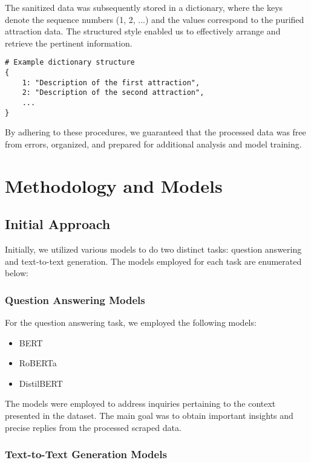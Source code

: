 \documentclass[conference]{IEEEtran}
\begin{document}
    The sanitized data was subsequently stored in a dictionary, where the keys denote the sequence numbers (1, 2, ...) and the values correspond to the purified attraction data. The structured style enabled us to effectively arrange and retrieve the pertinent information.

    \begin{verbatim}
# Example dictionary structure
{
    1: "Description of the first attraction",
    2: "Description of the second attraction",
    ...
}
    \end{verbatim}

    By adhering to these procedures, we guaranteed that the processed data was free from errors, organized, and prepared for additional analysis and model training.

\section{Methodology and Models}

    \subsection{Initial Approach}

        Initially, we utilized various models to do two distinct tasks: question answering and text-to-text generation. The models employed for each task are enumerated below:

        \subsubsection{Question Answering Models}

        For the question answering task, we employed the following models:
        \begin{itemize}
            \item BERT
            \item RoBERTa
            \item DistilBERT
        \end{itemize}

        The models were employed to address inquiries pertaining to the context presented in the dataset. The main goal was to obtain important insights and precise replies from the processed scraped data.

        \subsubsection{Text-to-Text Generation Models}
\end{document}
